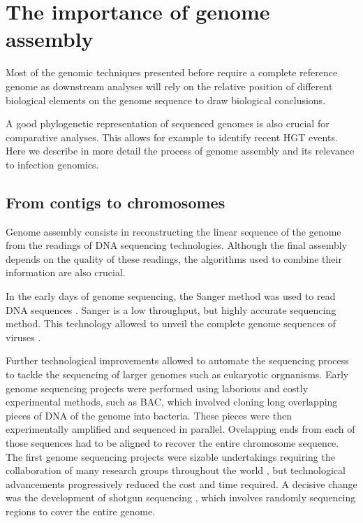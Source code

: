 
\chapter{The importance of genome assembly} %

\label{ch:01-03} %

Most of the genomic techniques presented before require a complete reference genome as downstream analyses will rely on the relative position of different biological elements on the genome sequence to draw biological conclusions. 

A good phylogenetic representation of sequenced genomes is also crucial for comparative analyses. This allows for example to  identify recent \acrshort{HGT} events. Here we describe in more detail the process of genome assembly and its relevance to infection genomics.

\section{From contigs to chromosomes}

Genome assembly consists in reconstructing the linear sequence of the genome from the readings of DNA sequencing technologies. Although the final assembly depends on the quality of these readings, the algorithms used to combine their information are also crucial.

In the early days of genome sequencing, the Sanger method was used to read DNA sequences \cite{sangerDNASequencingChainterminating1977}. Sanger is a low throughput, but highly accurate sequencing method. This technology allowed to unveil the complete genome sequences of viruses  \citep{sangerNucleotideSequenceBacteriophage1982,baerDNASequenceExpression1984}.

Further technological improvements allowed to automate the sequencing process to tackle the sequencing of larger genomes such as eukaryotic orgnanisms. Early genome sequencing projects were performed using laborious and costly experimental methods, such as \acrfull{BAC}, which involved cloning long overlapping pieces of DNA of the genome into bacteria. These pieces were then experimentally amplified and sequenced in parallel. Ovelapping ends from each of those sequences had to be aligned to recover the entire chromosome sequence. The first genome sequencing projects were sizable undertakings requiring the collaboration of many research groups throughout the world \citep{collinsNewFiveyearPlan1993,adamsGenomeSequenceDrosophila2000,oliverCompleteDNASequence1992}, but technological advancements progressively reduced the cost and time required. A decisive change was the development of shotgun sequencing \cite{venterSequenceHumanGenome2001}, which involves randomly sequencing regions to cover the entire genome.

